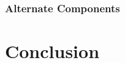 \subsubsection{Alternate Components}

\- \vfill

								
	
 
%      
	
	











\section{Conclusion}

